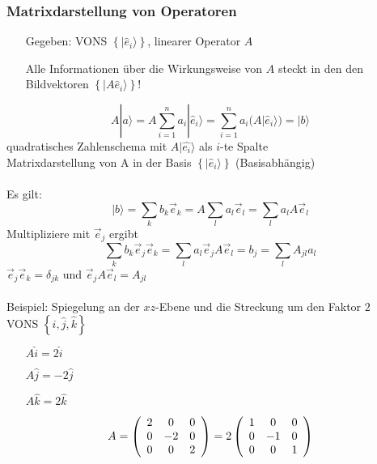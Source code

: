 \documentclass{article}
\begin{document}
\subsubsection{Matrixdarstellung von Operatoren}
\begin{itemize}
    \item[Gegeben:] VONS $\left\{|\hat{e}_i\rangle\right\}$, linearer Operator $A$
    \item[] Alle Informationen über die Wirkungsweise von $A$ steckt in den den Bildvektoren $\left\{|A\hat{e}_i\rangle\right\}$!
\end{itemize}
\begin{equation*}
    A|a\rangle = A\sum_{i=1}^{n}a_i|\hat{e}_i\rangle = \sum_{i=1}^{n} a_i(A|\hat{e}_i\rangle) = |b\rangle
\end{equation*}
quadratisches Zahlenschema mit $A|\hat{e_i}\rangle$ als $i$-te Spalte \\
Matrixdarstellung von A in der Basis $\left\{|\hat{e}_i\rangle\right\}$ (Basisabhängig)\\\\
Es gilt:
\begin{equation*}
    |b\rangle = \sum_{k} b_k\vec{e}_k = A\sum_{l} a_l \vec{e}_l = \sum_{l} a_lA\vec{e}_l
\end{equation*}
Multipliziere mit $\vec{e}_j$ ergibt
\begin{equation*}
    \sum_{k}b_k\vec{e}_j\vec{e}_k = \sum_{l} a_l\vec{e}_jA\vec{e}_l = b_j = \sum_{l}A_{jl}a_l
\end{equation*}
$\vec{e}_j\vec{e}_k = \delta_{jk}$ und $\vec{e}_jA\vec{e}_l = A_{jl}$\\\\
Beispiel: Spiegelung an der $xz$-Ebene und die Streckung um den Faktor $2$\\
VONS $\left\{ \hat{i}, \hat{j}, \hat{k} \right\}$\\
\begin{itemize}
    \item[] $A\hat{i} = 2\hat{i}$
    \item[] $A\hat{j} = -2\hat{j}$
    \item[] $A\hat{k} = 2\hat{k}$
\end{itemize}
\begin{equation*}
    A = \left(\begin{array}{c c c}
        2 & 0 & 0\\
        0 & -2 & 0\\
        0 & 0 & 2\\
    \end{array}\right) = 2 \left(\begin{array}{c c c}
        1 & 0 & 0\\
        0 & -1 & 0\\
        0 & 0 & 1\\
    \end{array} \right)
\end{equation*}
\end{document}
